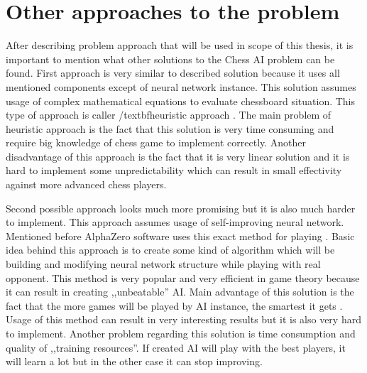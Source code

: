     \section{Other approaches to the problem}\label{sec:other-approaches-to-problem}
    After describing problem approach that will be used in scope of this thesis, it is important to mention what other solutions to the Chess AI problem can be found. First approach is very similar to described solution because it uses all mentioned components except of neural network instance. This solution assumes usage of complex mathematical equations to evaluate chessboard situation. This type of approach is caller /textbf{heuristic approach} \cite{bib:article-computer-chess-move-ordering,bib:internet-step-by-step-chess-ai}. The main problem of heuristic approach is the fact that this solution is very time consuming and require big knowledge of chess game to implement correctly. Another disadvantage of this approach is the fact that it is very linear solution and it is hard to implement some unpredictability which can result in small effectivity against more advanced chess players.

    Second possible approach looks much more promising but it is also much harder to implement. This approach assumes usage of self-improving neural network. Mentioned before AlphaZero software uses this exact method for playing \cite{bib:internet-alphazero}. Basic idea behind this approach is to create some kind of algorithm which will be building and modifying neural network structure while playing with real opponent. This method is very popular and very efficient in game theory because it can result in creating ,,unbeatable'' AI. Main advantage of this solution is the fact that the more games will be played by AI instance, the smartest it gets \cite{bib:article-self-improving-nn}. Usage of this method can result in very interesting results but it is also very hard to implement. Another problem regarding this solution is time consumption and quality of ,,training resources''. If created AI will play with the best players, it will learn a lot but in the other case it can stop improving.



